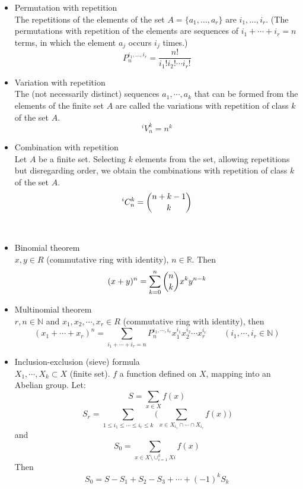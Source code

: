 \documentclass[margin=0px]{article}
\newcommand{\N}{\mathbb{N}}
\newcommand{\R}{\mathbb{R}}
\begin{document}
\begin{description}
\begin{itemize}
            \item Permutation with repetition \\
                  The repetitions of the elements of the set $A = \{a_1,\dotsc,a_r\}$ are $i_1,\dotsc,i_r$. (The permutations with repetition of the elements are sequences of $i_1+\cdots+i_r = n$ terms, in which the element $a_j$ occurs $i_j$ times.)
                  \[P_n^{i_1,\dotsc,i_r} = \frac{n!}{i_1!i_2!\cdots i_r!}\]
            \item Variation with repetition \\
                  The (not necessarily distinct) sequences $a_1,\cdots,a_k$ that can be formed from the elements of the finite set $A$ are called the variations with repetition of class $k$ of the set $A$.
                  \[^iV_n^k = n^k\]
            \item Combination with repetition \\
                  Let $A$ be a finite set. Selecting $k$ elements from the set, allowing repetitions but disregarding order, we obtain the combinations with repetition of class $k$ of the set $A$.
                  \[^iC_n^k = \dbinom{n+k-1}{k} \]
        \end{itemize}
    \item[Theorems] \hfill \\
        \begin{itemize}
            \item Binomial theorem \\
                  $x,y \in R$ (commutative ring with identity), $n\in\R$. Then
                  \[(x+y)^n = \sum\limits_{k=0}^n\dbinom{n}{k}x^ky^{n-k} \]
            \item Multinomial theorem \\
                  $r,n\in\N$ and $x_1, x_2, \cdots, x_r \in R$ (commutative ring with identity), then
                  \[(x_1+\cdots+x_r)^n = \sum\limits_{i_1+\cdots+i_r = n}P_n^{i_1,\cdots,i_r}x_1^{i_1}x_2^{i_2}\cdots x_r^{i_r} \qquad (i_1,\cdots,i_r \in\N)\]
            \item Inclusion-exclusion (sieve) formula \\
                  $X_1,\cdots,X_k \subset X$ (finite set). $f$ a function defined on $X$, mapping into an Abelian group. Let:
                  \[S=\sum\limits_{x\in X}f(x)\]
                  \[ S_r = \sum\limits_{1\leq i_1 \leq \cdots \leq i_r \leq k}\Bigg(\sum\limits_{x \in X_{i_1} \cap \cdots \cap X_{i_r}}f(x)\Bigg) \]
                  and
                  \[S_0 = \sum\limits_{x\in X \setminus \cup_{i=1}^k Xi}f(x)\]
                  Then
                  \[S_0 = S - S_1+S_2-S_3+\cdots+(-1)^kS_k \]
        \end{itemize}
\end{description}
\end{document}
